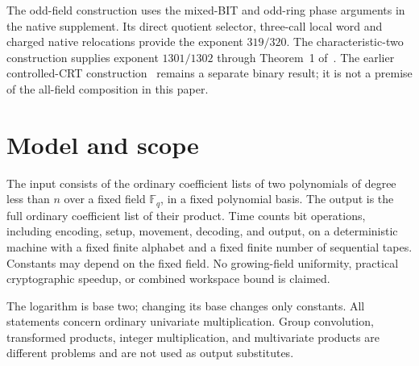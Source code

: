 \documentclass[11pt]{article}
\theoremstyle{definition}
\newcommand{\F}{\mathbb F}
\begin{document}
The odd-field construction uses the mixed-BIT and odd-ring phase
arguments in the native supplement. Its direct quotient selector,
three-call local word and charged native relocations provide the
exponent $319/320$. The characteristic-two construction supplies
exponent $1301/1302$ through Theorem~1 of~\cite{PairedPhase}.
The earlier controlled-CRT construction~\cite{ControlledCRT} remains
a separate binary result; it is not a premise of the all-field
composition in this paper.

\section{Model and scope}
The input consists of the ordinary coefficient lists of two polynomials
of degree less than $n$ over a fixed field $\F_q$, in a fixed polynomial
basis. The output is the full ordinary coefficient list of their
product. Time counts bit operations, including encoding, setup,
movement, decoding, and output, on a deterministic machine with a fixed
finite alphabet and a fixed finite number of sequential tapes. Constants
may depend on the fixed field. No growing-field uniformity, practical
cryptographic speedup, or combined workspace bound is claimed.

The logarithm is base two; changing its base changes only constants.
All statements concern ordinary univariate multiplication. Group
convolution, transformed products, integer multiplication, and
multivariate products are different problems and are not used as output
substitutes.
\end{document}
